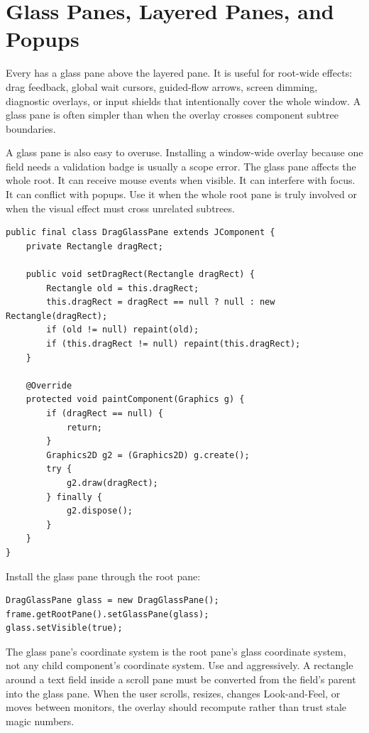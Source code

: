 \section{Glass Panes, Layered Panes, and Popups}

Every  has a glass pane above the layered pane. It is useful for root-wide effects: drag feedback, global wait cursors, guided-flow arrows, screen dimming, diagnostic overlays, or input shields that intentionally cover the whole window. A glass pane is often simpler than  when the overlay crosses component subtree boundaries.

A glass pane is also easy to overuse. Installing a window-wide overlay because one field needs a validation badge is usually a scope error. The glass pane affects the whole root. It can receive mouse events when visible. It can interfere with focus. It can conflict with popups. Use it when the whole root pane is truly involved or when the visual effect must cross unrelated subtrees.

\begin{lstlisting}[caption={Installing a simple root-pane glass overlay.}]
public final class DragGlassPane extends JComponent {
    private Rectangle dragRect;

    public void setDragRect(Rectangle dragRect) {
        Rectangle old = this.dragRect;
        this.dragRect = dragRect == null ? null : new Rectangle(dragRect);
        if (old != null) repaint(old);
        if (this.dragRect != null) repaint(this.dragRect);
    }

    @Override
    protected void paintComponent(Graphics g) {
        if (dragRect == null) {
            return;
        }
        Graphics2D g2 = (Graphics2D) g.create();
        try {
            g2.draw(dragRect);
        } finally {
            g2.dispose();
        }
    }
}
\end{lstlisting}

Install the glass pane through the root pane:

\begin{lstlisting}
DragGlassPane glass = new DragGlassPane();
frame.getRootPane().setGlassPane(glass);
glass.setVisible(true);
\end{lstlisting}

The glass pane's coordinate system is the root pane's glass coordinate system, not any child component's coordinate system. Use  and  aggressively. A rectangle around a text field inside a scroll pane must be converted from the field's parent into the glass pane. When the user scrolls, resizes, changes Look-and-Feel, or moves between monitors, the overlay should recompute rather than trust stale magic numbers.

